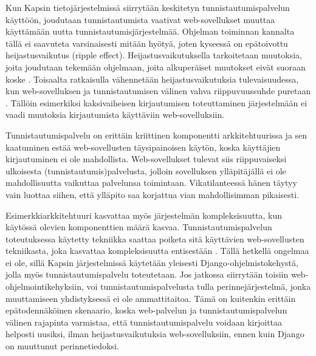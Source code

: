 Kun Kapsin tietojärjestelmissä siirrytään keskitetyn tunnistautumispalvelun käyttöön, joudutaan tunnistautumista vaativat web-sovellukset muuttaa käyttämään uutta tunnistautumisjärjestelmää. Ohjelman toiminnan kannalta tällä ei saavuteta varsinaisesti mitään hyötyä, joten kyseessä on epätoivottu heijastusvaikutus (ripple effect). Heijastusvaikutuksella tarkoitetaan muutoksia, joita joudutaan tekemään ohjelmaan, joita alkuperäiset muutokset eivät suoraan koske \cite{arkkitehtuurit}. Toisaalta ratkaisulla vähennetään heijastusvaikutuksia tulevaisuudessa, kun web-sovelluksen ja tunnistautumisen välinen vahva riippuvuussuhde puretaan \cite{arkkitehtuurit}. Tällöin esimerkiksi kaksivaiheisen kirjautumisen toteuttaminen järjestelmään ei vaadi muutoksia kirjautumista käyttäviin web-sovelluksiin.

Tunnistautumispalvelu on erittäin kriittinen komponentti arkkitehtuurissa ja sen kaatuminen estää web-sovellusten täysipainoisen käytön, koska käyttäjien kirjautuminen ei ole mahdollista. Web-sovellukset tulevat siis riippuvaiseksi ulkoisesta (tunnistautumis)palvelusta, jolloin sovelluksen ylläpitäjällä ei ole mahdollisuutta vaikuttaa palvelunsa toimintaan. Vikatilanteessä hänen täytyy vain luottaa siihen, että ylläpito saa korjattua vian mahdollisimman pikaisesti.

Esimerkkiarkkitehtuuri kasvattaa myös järjestelmän kompleksisuutta, kun käytössä olevien komponenttien määrä kasvaa. Tunnistautumispalvelun toteutuksessa käytetty tekniikka saattaa poiketa sitä käyttävien web-sovellusten tekniikasta, joka kasvattaa kompleksisuutta entisestään \cite{arkkitehtuurit}. Tällä hetkellä ongelmaa ei ole, sillä Kapsin järjestelmissä käytetään yleisesti Django-ohjelmistokehystä, jolla myös tunnistautumispalvelu toteutetaan. Jos jatkossa siirrytään toisiin web-ohjelmointikehyksiin, voi tunnistautumispalvelusta tulla perinnejärjestelmä, jonka muuttamiseen yhdistyksessä ei ole ammattitaitoa. Tämä on kuitenkin erittäin epätodennäköinen skenaario, koska web-palvelun ja tunnistautumispalvelun välinen rajapinta varmistaa, että tunnistautumispalvelu voidaan kirjoittaa helposti uusiksi, ilman heijastusvaikutuksia web-sovelluksiin, ennen kuin Django on muuttunut perinnetiedoksi.